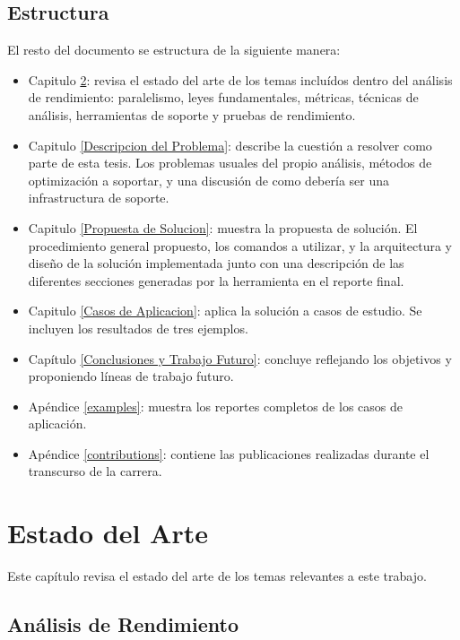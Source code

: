 \documentclass[a4paper]{report}
\begin{document}
\section{Estructura}

El resto del documento se estructura de la siguiente manera:

\begin{itemize}
\item Capitulo \ref{Estado del Arte}: revisa el estado del arte de los temas incluídos dentro del análisis de rendimiento: paralelismo, leyes fundamentales, métricas, técnicas de análisis,
herramientas de soporte y pruebas de rendimiento.
\item Capitulo \ref{Descripcion del Problema}: describe la cuestión a resolver como parte de esta tesis. Los problemas usuales del propio análisis, métodos de optimización a soportar, y una
discusión de como debería ser una infrastructura de soporte.
\item Capitulo \ref{Propuesta de Solucion}: muestra la propuesta de solución. El procedimiento general propuesto, los comandos a utilizar, y la arquitectura y diseño de la solución implementada junto con una descripción de las diferentes secciones generadas por la herramienta en el reporte final.
\item Capitulo \ref{Casos de Aplicacion}: aplica la solución a casos de estudio. Se incluyen los resultados de tres ejemplos.
\item Capítulo \ref{Conclusiones y Trabajo Futuro}: concluye reflejando los objetivos y proponiendo líneas de trabajo futuro. 
\item Apéndice \ref{examples}: muestra los reportes completos de los casos de aplicación.
\item Apéndice \ref{contributions}: contiene las publicaciones realizadas durante el transcurso de la carrera.

\end{itemize}

\chapter{Estado del Arte} \label{Estado del Arte}

Este capítulo revisa el estado del arte de los temas relevantes a este trabajo.

\section{Análisis de Rendimiento}\label{chapter:analysis}
\end{document}
